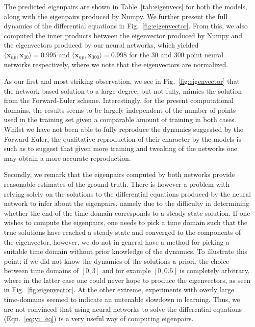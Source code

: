 \documentclass[reprint, english, nofootinbib]{revtex4-2}
\begin{document}
The predicted eigenpairs are shown in Table~\ref{tab:eigenvecs} for both the models, along with the eigenpairs produced by Numpy. We further present the full dynamics of the differential equations in Fig.~\ref{fig:eigenvector}. From this, we also computed the inner products between the eigenvector produced by Numpy and the eigenvectors produced by our neural networks, which yielded $\langle \pmb x_{np}, \pmb x_{30}\rangle = 0.995$ and $\langle \pmb x_{np}, \pmb x_{300}\rangle = 0.998$ for the 30 and 300 point neural networks respectively, where we note that the eigenvectors are normalized.

As our first and most striking observation, we see in Fig.~\ref{fig:eigenvector} that the network based solution to a large degree, but not fully, mimics the solution from the Forward-Euler scheme. Interestingly, for the present computational domains, the results seems to be largely independent of the number of points used in the training set given a comparable amount of training in both cases. Whilst we have not been able to fully reproduce the dynamics suggested by the Forward-Euler, the qualitative reproduction of their character by the models is such as to suggest that given more training and tweaking of the networks one may obtain a more accurate reproduction.

Secondly, we remark that the eigenpairs computed by both networks provide reasonable estimates of the ground truth. There is however a problem with relying solely on the solutions to the differential equations produced by the neural network to infer about the eigenpairs, namely due to the difficulty in determining whether the end of the time domain corresponds to a steady state solution. If one wishes to compute the eigenpairs, one needs to pick a time domain such that the true solutions have reached a steady state and converged to the components of the eigenvector, however, we do not in general have a method for picking a suitable time domain without prior knowledge of the dynamics. To illustrate this point; if we did not know the dynamics of the solutions a priori, the choice between time domains of $[0,3]$ and for example $[0,0.5]$ is completely arbitrary, where in the latter case one could never hope to produce the eigenvectors, as seen in Fig.~\ref{fig:eigenvector}. At the other extreme, experiments with overly large time-domains seemed to indicate an untenable slowdown in learning. Thus, we are not convinced that using neural networks to solve the differential equations (Eqn.~\ref{eq:yi_eq}) is a very useful way of computing eigenpairs.
\end{document}
